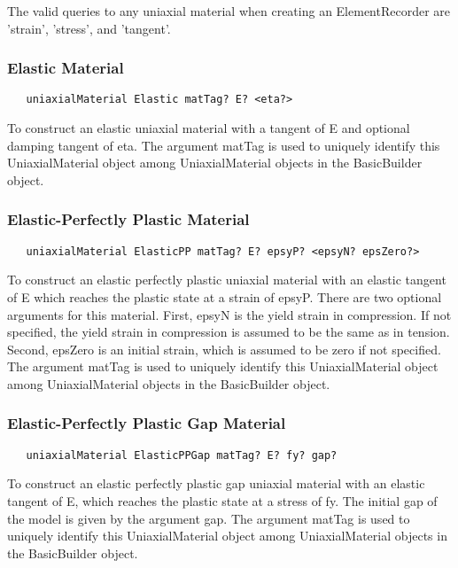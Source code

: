 \documentclass[12pt]{article}
\begin{document}
The valid queries to any uniaxial material when creating an ElementRecorder
are 'strain', 'stress', and 'tangent'.

\subsubsection{Elastic Material}
{\sf\small
\begin{verbatim}
   uniaxialMaterial Elastic matTag? E? <eta?>
\end{verbatim}
}

\noindent To construct an elastic uniaxial material with a tangent of E
and optional damping tangent of eta. The argument matTag is used to
uniquely identify this UniaxialMaterial object among UniaxialMaterial objects
in the BasicBuilder object.

\subsubsection{Elastic-Perfectly Plastic Material}
{\sf\small
\begin{verbatim}
   uniaxialMaterial ElasticPP matTag? E? epsyP? <epsyN? epsZero?>
\end{verbatim}
}

\noindent To construct an elastic perfectly plastic uniaxial material
with an elastic tangent of E which
reaches the plastic state at a strain of epsyP. There are two optional
arguments for this material. First, epsyN is the yield strain in compression.
If not specified, the yield strain in compression is assumed to be the same
as in tension. Second, epsZero is an initial strain, which is assumed to
be zero if not specified.
The argument matTag is used to
uniquely identify this UniaxialMaterial object among UniaxialMaterial objects
in the BasicBuilder object.

\subsubsection{Elastic-Perfectly Plastic Gap Material}
{\sf\small
\begin{verbatim}
   uniaxialMaterial ElasticPPGap matTag? E? fy? gap?
\end{verbatim}
}

\noindent To construct an elastic perfectly plastic gap uniaxial material
with an elastic tangent of E, which reaches the plastic state at a stress 
of fy. The initial gap of the model is given by the argument gap. The argument
matTag is used to uniquely identify this UniaxialMaterial object among
UniaxialMaterial objects in the BasicBuilder object.
\end{document}
